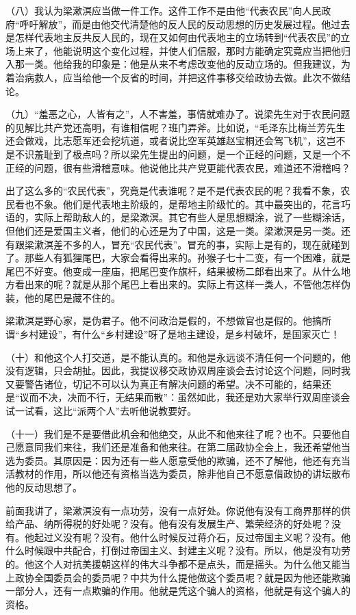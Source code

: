 （八）我认为梁漱溟应当做一件工作。这件工作不是由他“代表农民”向人民政府“呼吁解放”，而是由他交代清楚他的反人民的反动思想的历史发展过程。他过去是怎样代表地主反共反人民的，现在又如何由代表地主的立场转到“代表农民”的立场上来了，他能说明这个变化过程，并使人们信服，那时方能确定究竟应当把他归入那一类。他给我的印象是：他是从来不考虑改变他的反动立场的。但我建议，为着治病救人，应当给他一个反省的时间，并把这件事移交给政协去做。此次不做结论。

（九）“羞恶之心，人皆有之”，人不害羞，事情就难办了。说梁先生对于农民问题的见解比共产党还高明，有谁相信呢？班门弄斧。比如说，“毛泽东比梅兰芳先生还会做戏，比志愿军还会挖坑道，或者说比空军英雄赵宝桐还会驾飞机”，这岂不是不识羞耻到了极点吗？所以梁先生提出的问题，是一个正经的问题，又是一个不正经的问题，很有些滑稽意味。他说他比共产党更能代表农民，难道还不滑稽吗？

出了这么多的“农民代表”，究竟是代表谁呢？是不是代表农民的呢？我看不象，农民看也不象。他们是代表地主阶级的，是帮地主阶级忙的。其中最突出的，花言巧语的，实际上帮助敌人的，是梁漱溟。其它有些人是思想糊涂，说了一些糊涂话，但他们还是爱国主义者，他们的心还是为了中国，这是一类。梁漱溟是另一类。还有跟梁漱溟差不多的人，冒充“农民代表”。冒充的事，实际上是有的，现在就碰到了。那些人有狐狸尾巴，大家会看得出来的。孙猴子七十二变，有一个困难，就是尾巴不好变。他变成一座庙，把尾巴变作旗杆，结果被杨二郎看出来了。从什么地方看出来的呢？就是从那个尾巴上看出来的。实际上有这样一类人，不管他怎样伪装，他的尾巴是藏不住的。

梁漱溟是野心家，是伪君子。他不问政治是假的，不想做官也是假的。他搞所谓“乡村建设”，有什么“乡村建设”呀了是地主建设，是乡村破坏，是国家灭亡！

（十）和他这个人打交道，是不能认真的。和他是永远谈不清任何一个问题的，他没有逻辑，只会胡扯。因此，我提议移交政协双周座谈会去讨论这个问题，同时我又要警告诸位，切记不可以认为真正有解决问题的希望。决不可能的，结果还是“议而不决，决而不行，无结果而散”：虽然如此，我还是劝大家举行双周座谈会试一试看，这比“派两个人”去听他说教要好。

（十一）我们是不是要借此机会和他绝交，从此不和他来往了呢？也不。只要他自己愿意同我们来往，我们还是准备和他来往。在第二届政协全会上，我还希望他当选为委员。其原因是：因为还有一些人愿意受他的欺骗，还不了解他，他还有充当活教材的作用，所以他还有资格当选为委员，除非他自己不愿意借政协的讲坛散布他的反动思想了。

前面我讲了，梁漱溟没有一点功劳，没有一点好处。你说他有没有工商界那样的供给产品、纳所得税的好处呢？没有。他有没有发展生产、繁荣经济的好处呢？没有。他起过义没有呢？没有。他什么时候反过蒋介石，反过帝国主义呢？没有。他什么时候跟中共配合，打倒过帝国主义、封建主义呢？没有。所以，他是没有功劳的。他这个人对抗美援朝这样的伟大斗争都不是点头，而是摇头。为什么他又能当上政协全国委员会的委员呢？中共为什么提他做这个委员呢？就是因为他还能欺骗一部分人，还有一点欺骗的作用。他就是凭这个骗人的资格，他就是有这个骗人的资格。

